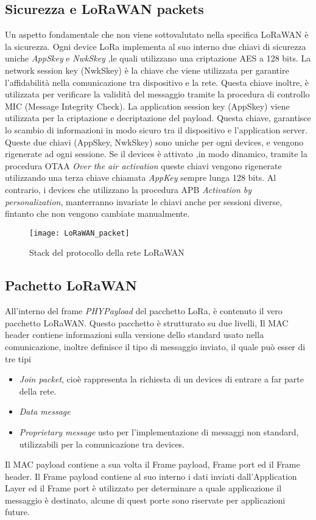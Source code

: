 \subsection{Sicurezza e LoRaWAN packets}
Un aspetto fondamentale che non viene sottovalutato nella specifica LoRaWAN è la
sicurezza. Ogni device LoRa implementa al suo interno due chiavi di sicurezza
uniche \emph{AppSkey} e \emph{NwkSkey} ,le quali utilizzano una criptazione AES a
128 bits.
La network session key (NwkSkey) è la chiave che viene utilizzata per garantire
l'affidabilità nella comunicazione tra dispositivo e la rete. Questa chiave
inoltre, è utilizzata per verificare la validità del messaggio tramite la
procedura di controllo MIC (Message Integrity Check). 
La application session key (AppSkey) viene utilizzata per la criptazione e
decriptazione del payload. Questa chiave, garantisce lo scambio di informazioni 
in modo sicuro tra il dispositivo e l'application server. 
Queste due chiavi (AppSkey, NwkSkey) sono uniche per ogni devices, e vengono
rigenerate ad ogni sessione. Se il devices è attivato ,in modo dinamico, tramite
la procedura OTAA \emph{Over the air activation} queste chiavi vengono
rigenerate utilizzando una terza chiave chiamata \emph{AppKey} sempre lunga
128 bits. Al contrario, i devices che utilizzano la procedura APB
\emph{Activation by personalization}, manterranno invariate le chiavi anche per
sessioni diverse, fintanto che non vengono cambiate manualmente.

\begin{figure}[h]
        \centering 
                \texttt{[image: LoRaWAN\_packet]}
        \caption{Stack del protocollo della rete LoRaWAN}
        \label{fig:stack_lora}
\end{figure}
\subsection{Pachetto LoRaWAN}
All'interno del frame \emph{PHYPayload} del pacchetto LoRa,  è contenuto il vero 
pacchetto LoRaWAN. 
Questo pacchetto è strutturato su due livelli,
Il MAC header contiene informazioni sulla versione dello standard usato nella
comunicazione, inoltre definisce il tipo di messaggio inviato, il quale può
esser di tre tipi
\begin{itemize}
        \item   \textit{Join packet}, cioè rappresenta la richiesta di un devices
                di entrare a far parte della rete.
        \item   \textit{Data message}
        \item   \textit{Proprietary message} usto per l'implementazione di
                messaggi non standard, utilizzabili per la comunicazione tra devices.
\end{itemize}
Il MAC payload contiene a sua volta il Frame payload, Frame port ed il Frame
header. Il Frame payload contiene al suo interno i dati inviati dall'Application
Layer ed il Frame port è utilizzato per determinare a quale applicazione il
messaggio è destinato, alcune di quest porte sono riservate per applicazioni
future.

